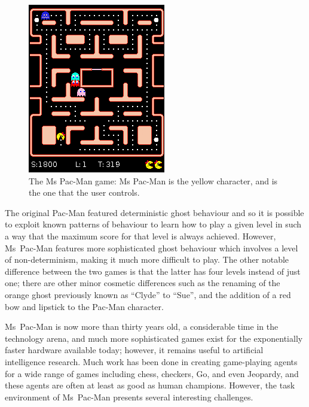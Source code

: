 \begin{figure}
\includegraphics[width=\linewidth]{diagrams/pac-man}
\caption[The Ms Pac-Man game]{The Ms Pac-Man game: Ms Pac-Man is the yellow character, and is the one that the user controls.}
\label{fig:pac-man}
\end{figure}

The original Pac-Man featured deterministic ghost behaviour and so it is possible to exploit known patterns of behaviour to learn how to play a given level in such a way that the maximum score for that level is always achieved.  However, Ms~Pac-Man features more sophisticated ghost behaviour which involves a level of non-determinism, making it much more difficult to play.  The other notable difference between the two games is that the latter has four levels instead of just one; there are other minor cosmetic differences such as the renaming of the orange ghost previously known as ``Clyde'' to ``Sue'', and the addition of a red bow and lipstick to the Pac-Man character.

Ms~Pac-Man is now more than thirty years old, a considerable time in the technology arena, and much more sophisticated games exist for the exponentially faster hardware available today; however, it remains useful to artificial intelligence research.  Much work has been done in creating game-playing agents for a wide range of games including chess, checkers, Go, and even Jeopardy, and these agents are often at least as good as human champions.  However, the task environment  of Ms~Pac-Man presents several interesting challenges.

